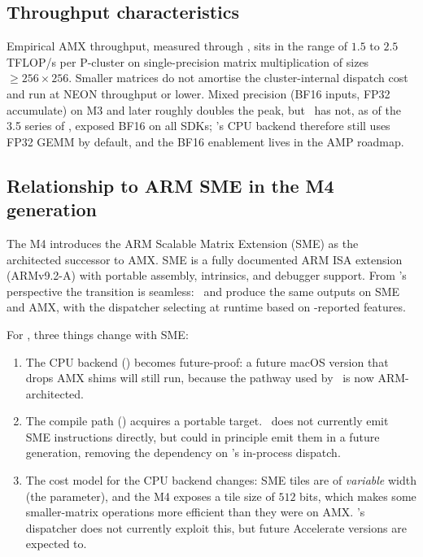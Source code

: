\subsection{Throughput characteristics}
\label{ssec:apple_silicon:amx_perf}

Empirical AMX throughput, measured through , sits
in the range of $1.5$ to $2.5$ TFLOP/s per P-cluster on
single-precision matrix multiplication of sizes
$\geq 256 \times 256$. Smaller matrices do not amortise the
cluster-internal dispatch cost and run at NEON throughput or lower.
Mixed precision (BF16 inputs, FP32 accumulate) on M3 and later
roughly doubles the peak, but \Accelerate\ has not, as of the 3.5
series of \Lucid, exposed BF16  on all
SDKs; \Lucid's CPU backend therefore still uses FP32 GEMM by default,
and the BF16 enablement lives in the AMP roadmap.

\subsection{Relationship to ARM SME in the M4 generation}
\label{ssec:apple_silicon:sme}

The M4 introduces the ARM Scalable Matrix Extension (SME) as the
architected successor to AMX. SME is a fully documented ARM ISA
extension (ARMv9.2-A) with portable assembly, intrinsics, and
debugger support. From \Accelerate's perspective the transition is
seamless: \BNNS\ and  produce the same outputs on
SME and AMX, with the dispatcher selecting at runtime based on
-reported features.

For \Lucid, three things change with SME:

\begin{enumerate}
  \item The CPU backend (\Accelerate) becomes future-proof: a future
    macOS version that drops AMX shims will still run, because the
    pathway used by \Accelerate\ is now ARM-architected.
  \item The compile path () acquires a
    portable target. \Lucid\ does not currently emit SME instructions
    directly, but  could in principle emit them
    in a future generation, removing the dependency on \Accelerate's
    in-process dispatch.
  \item The cost model for the CPU backend changes: SME tiles are
    of \emph{variable} width (the  parameter), and the M4
    exposes a tile size of $512$ bits, which makes some smaller-matrix
    operations more efficient than they were on AMX. \Lucid's
    dispatcher does not currently exploit this, but future Accelerate
    versions are expected to.
\end{enumerate}

